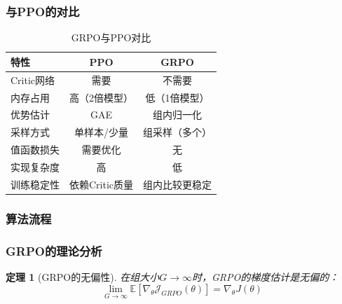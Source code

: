 \documentclass[12pt,a4paper]{article}
\newenvironment{algorithmic}[1][]%
      {\begin{list}{}{\leftmargin=2em\itemsep=0.2em\parsep=0pt\topsep=0.2em}}%
      {\end{list}}
\newcommand{\STATE}{\item[]}
\newcommand{\FOR}[1]{\item[]\textbf{for} ##1 \textbf{do}}
\newcommand{\ENDFOR}{\item[]\textbf{end for}}
\newtheorem{theorem}{定理}[section]
\begin{document}
\subsubsection{与PPO的对比}

\begin{table}[H]
\centering
\caption{GRPO与PPO对比}
\begin{tabular}{lcc}
\toprule
\textbf{特性} & \textbf{PPO} & \textbf{GRPO} \\
\midrule
Critic网络 & 需要 & 不需要 \\
内存占用 & 高（2倍模型） & 低（1倍模型） \\
优势估计 & GAE & 组内归一化 \\
采样方式 & 单样本/少量 & 组采样（多个） \\
值函数损失 & 需要优化 & 无 \\
实现复杂度 & 高 & 低 \\
训练稳定性 & 依赖Critic质量 & 组内比较更稳定 \\
\bottomrule
\end{tabular}
\end{table}

\subsubsection{算法流程}


\subsubsection{GRPO的理论分析}

\begin{theorem}[GRPO的无偏性]
在组大小$G \rightarrow \infty$时，GRPO的梯度估计是无偏的：
\begin{equation}
\lim_{G \rightarrow \infty} \mathbb{E}\left[\nabla_\theta \mathcal{J}_{GRPO}(\theta)\right] = \nabla_\theta J(\theta)
\end{equation}
\end{theorem}
\end{document}
